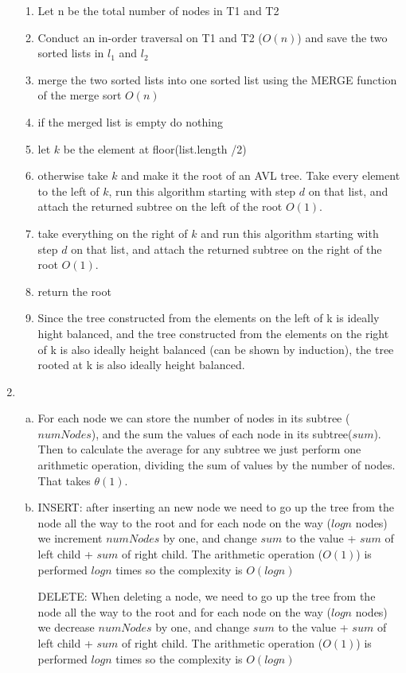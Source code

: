 \documentclass[11pt]{article}
\begin{document}
\begin{enumerate}
\begin{enumerate}
				\item Let n be the total number of nodes in T1 and T2
				\item Conduct an in-order traversal on T1 and T2 ($O(n)$) and save the two sorted lists in $l_1$ and $l_2$
				\item merge the two sorted lists into one sorted list using the MERGE function of the merge sort $O(n)$
				\item if the merged list is empty do nothing
				\item let $k$ be the element at floor(list.length /2)
				\item otherwise take $k$ and make it the root of an AVL tree. Take every element to the left of $k$, run this algorithm starting with step $d$ on that list, and attach the returned subtree on the left of the root $O(1)$.
				\item take everything on the right of $k$ and run this algorithm starting with step $d$ on that list, and attach the returned subtree on the right of the root $O(1)$.
				\item return the root
				
				\item Since the tree constructed from the elements on the left of k is ideally hight balanced, and the tree constructed from the elements on the right of k is also ideally height balanced (can be shown by induction), the tree rooted at k is also ideally height balanced.
	
			\end{enumerate}
		\item %
			\begin{enumerate}[a)]
				\item  
					For each node we can store the number of nodes in its subtree ($numNodes$), and the sum the values of each node in its subtree($sum$). Then to calculate the average for any subtree we just perform one arithmetic operation, dividing the sum of values by the number of nodes. That takes $\theta (1)$.
				\item

					INSERT: after inserting an new node we need to go up the tree from the node all the way to the root and for each node on the way ($log n$ nodes) we increment $numNodes$ by one, and change $sum$ to the value + $sum$ of left child + $sum$ of right child. The arithmetic operation ($O(1)$) is performed $log n$ times so the complexity is $O(logn)$
			
			
			 		DELETE: When deleting a node, we need to go up the tree from the node all the way to the root and for each node on the way ($log n$ nodes) we decrease $numNodes$ by one, and change $sum$ to the value + $sum$ of left child + $sum$ of right child. The arithmetic operation ($O(1)$) is performed $log n$ times so the complexity is $O(logn)$


\end{enumerate}
\end{enumerate}
\end{document}
